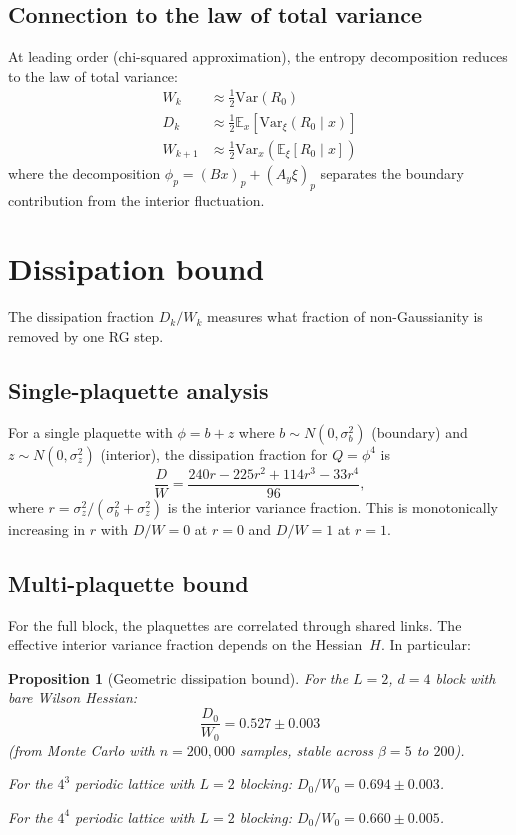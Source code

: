\documentclass[11pt]{article}
\newtheorem{proposition}[theorem]{Proposition}
\theoremstyle{definition}
\newcommand{\Var}{\mathrm{Var}}
\newcommand{\E}{\mathbb{E}}
\begin{document}
\subsection{Connection to the law of total variance}

At leading order (chi-squared approximation), the entropy decomposition 
reduces to the law of total variance:
\begin{align}
  W_k &\approx \tfrac{1}{2}\Var(R_0) \\
  D_k &\approx \tfrac{1}{2}\E_x[\Var_\xi(R_0 \mid x)] \\
  W_{k+1} &\approx \tfrac{1}{2}\Var_x(\E_\xi[R_0 \mid x])
\end{align}
where the decomposition $\phi_p = (Bx)_p + (A_y\xi)_p$ separates the 
boundary contribution from the interior fluctuation.


\section{Dissipation bound}\label{sec:dissipation}

The dissipation fraction $D_k/W_k$ measures what fraction of 
non-Gaussianity is removed by one RG step.

\subsection{Single-plaquette analysis}

For a single plaquette with $\phi = b + z$ where $b \sim N(0, \sigma_b^2)$ 
(boundary) and $z \sim N(0, \sigma_z^2)$ (interior), the dissipation 
fraction for $Q = \phi^4$ is
\[
  \frac{D}{W} = \frac{240 r - 225 r^2 + 114 r^3 - 33 r^4}{96},
\]
where $r = \sigma_z^2/(\sigma_b^2 + \sigma_z^2)$ is the interior 
variance fraction.  This is monotonically increasing in $r$ with 
$D/W = 0$ at $r = 0$ and $D/W = 1$ at $r = 1$.

\subsection{Multi-plaquette bound}

For the full block, the plaquettes are correlated through shared links.  
The effective interior variance fraction depends on the Hessian~$H$.  
In particular:

\begin{proposition}[Geometric dissipation bound]\label{prop:diss_geom}
For the $L = 2$, $d = 4$ block with bare Wilson Hessian:
\[
  \frac{D_0}{W_0} = 0.527 \pm 0.003
\]
(from Monte Carlo with $n = 200{,}000$ samples, stable across 
$\beta = 5$ to $200$).

For the $4^3$ periodic lattice with $L = 2$ blocking:
$D_0/W_0 = 0.694 \pm 0.003$.

For the $4^4$ periodic lattice with $L = 2$ blocking:
$D_0/W_0 = 0.660 \pm 0.005$.
\end{proposition}
\end{document}
